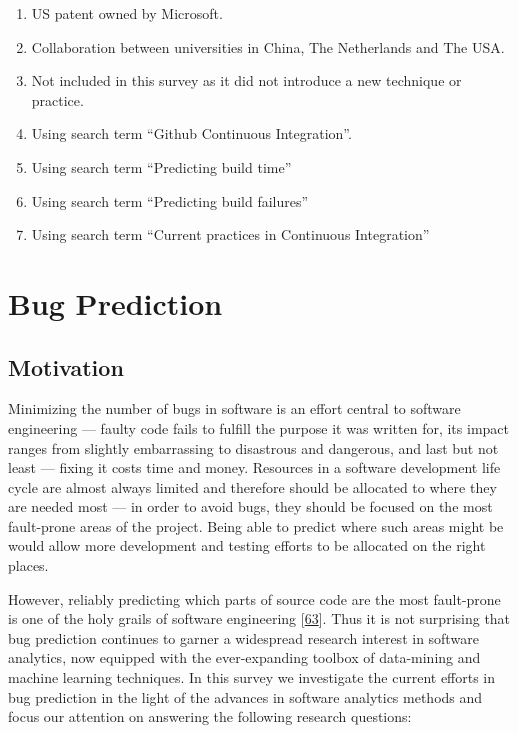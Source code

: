 \documentclass[]{book}
\providecommand{\tightlist}{%
  \setlength{\itemsep}{0pt}\setlength{\parskip}{0pt}}
\begin{document}
\begin{enumerate}
\def\labelenumi{\arabic{enumi}.}
\tightlist
\item
  US patent owned by Microsoft.
\item
  Collaboration between universities in China, The Netherlands and The
  USA.
\item
  Not included in this survey as it did not introduce a new technique or
  practice.
\item
  Using search term ``Github Continuous Integration''.
\item
  Using search term ``Predicting build time''
\item
  Using search term ``Predicting build failures''
\item
  Using search term ``Current practices in Continuous Integration''
\end{enumerate}

\chapter{Bug Prediction}\label{bug-prediction}

\section{Motivation}\label{motivation-2}

Minimizing the number of bugs in software is an effort central to
software engineering --- faulty code fails to fulfill the purpose it was
written for, its impact ranges from slightly embarrassing to disastrous
and dangerous, and last but not least --- fixing it costs time and
money. Resources in a software development life cycle are almost always
limited and therefore should be allocated to where they are needed most
--- in order to avoid bugs, they should be focused on the most
fault-prone areas of the project. Being able to predict where such areas
might be would allow more development and testing efforts to be
allocated on the right places.

However, reliably predicting which parts of source code are the most
fault-prone is one of the holy grails of software engineering
{[}\protect\hyperlink{ref-DAmbros2012}{63}{]}. Thus it is not surprising
that bug prediction continues to garner a widespread research interest
in software analytics, now equipped with the ever-expanding toolbox of
data-mining and machine learning techniques. In this survey we
investigate the current efforts in bug prediction in the light of the
advances in software analytics methods and focus our attention on
answering the following research questions:
\end{document}
